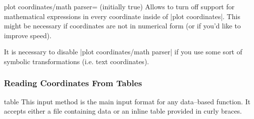 {\begin{pgfplotskey}{plot coordinates/math parser= (initially true)}
	Allows to turn off support for mathematical expressions in every coordinate inside of |plot coordinates|. This might be necessary if coordinates are not in numerical form (or if you'd like to improve speed).

	It is necessary to disable |plot coordinates/math parser| if you use some sort of symbolic transformations (i.e. text coordinates).
\end{pgfplotskey}


\subsubsection{Reading Coordinates From Tables}

\begin{addplotoperation}[]{table}{}
\label{pgfplots:addplot:table}
This input method is the main input format for any data--based function. It accepts either a file containing data or an inline table provided in curly braces.


\end{addplotoperation}}
